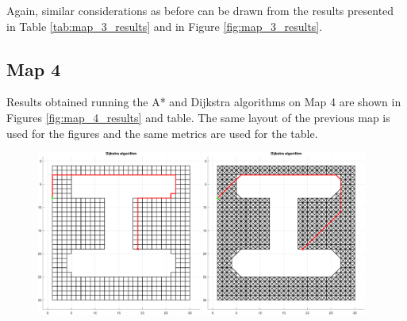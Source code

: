Again, similar considerations as before can be drawn from the results presented in Table \ref{tab:map_3_results} and in Figure \ref{fig:map_3_results}.


\subsection{Map 4}
\label{subsec:map_4}

Results obtained running the A* and Dijkstra algorithms on Map 4 are shown in Figures \ref{fig:map_4_results} and table.
The same layout of the previous map is used for the figures and the same metrics are used for the table.

\begin{figure}[H]
    \centering
    \includegraphics[width=0.48\textwidth]{./img/MATLAB/04_dijkstra_orthogonal.pdf}
    \hspace{6pt}
    \includegraphics[width=0.48\textwidth]{./img/MATLAB/04_dijkstra_diagonal.pdf}

    \vspace{11pt}


\end{figure}

